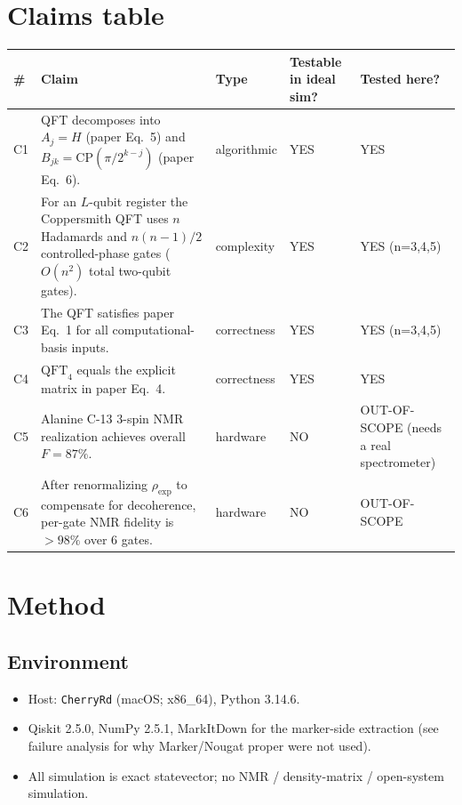 \documentclass[11pt]{article}
\begin{document}
\section{Claims table}

\begin{longtable}{p{0.5cm} p{5.5cm} p{2.2cm} p{2cm} p{4cm}}
\toprule
\# & Claim & Type & Testable in ideal sim? & Tested here? \\
\midrule
\endhead
C1 & QFT decomposes into $A_j = H$ (paper Eq.~5) and
     $B_{jk} = \text{CP}(\pi/2^{k-j})$ (paper Eq.~6). &
     algorithmic & YES & YES \\
C2 & For an $L$-qubit register the Coppersmith QFT uses
     $n$ Hadamards and $n(n-1)/2$ controlled-phase gates
     ($O(n^2)$ total two-qubit gates). &
     complexity & YES & YES (n=3,4,5) \\
C3 & The QFT satisfies paper Eq.~1 for all computational-basis
     inputs. & correctness & YES & YES (n=3,4,5) \\
C4 & $\text{QFT}_4$ equals the explicit matrix in paper Eq.~4. &
     correctness & YES & YES \\
C5 & Alanine C-13 3-spin NMR realization achieves overall
     $F = 87\%$. & hardware & NO & OUT-OF-SCOPE (needs a real
     spectrometer) \\
C6 & After renormalizing $\rho_\text{exp}$ to compensate for
     decoherence, per-gate NMR fidelity is $>98\%$ over 6 gates. &
     hardware & NO & OUT-OF-SCOPE \\
\bottomrule
\end{longtable}

\section{Method}

\subsection{Environment}
\begin{itemize}
  \item Host: \texttt{CherryRd} (macOS; x86\_64), Python 3.14.6.
  \item Qiskit 2.5.0, NumPy 2.5.1, MarkItDown for the marker-side
        extraction (see failure analysis for why Marker/Nougat
        proper were not used).
  \item All simulation is exact statevector; no NMR / density-matrix
        / open-system simulation.
\end{itemize}
\end{document}
